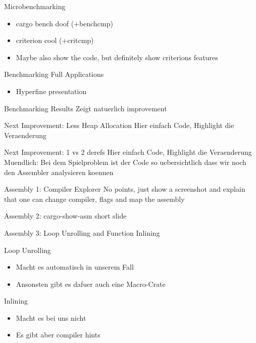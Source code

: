\documentclass[compress,aspectratio=169]{beamer}
\begin{document}
\begin{frame}{Microbenchmarking}
  \begin{itemize}
    \item cargo bench doof (+benchcmp)
    \item criterion cool (+critcmp)
    \item Maybe also show the code, but definitely show criterions features
  \end{itemize}
\end{frame}

\begin{frame}{Benchmarking Full Applications}
  \begin{itemize}
    \item Hyperfine presentation
  \end{itemize}
\end{frame}

\begin{frame}{Benchmarking Results}
  Zeigt natuerlich improvement
\end{frame}

\begin{frame}{Next Improvement: Less Heap Allocation}
  Hier einfach Code, Highlight die Veraenderung
\end{frame}

\begin{frame}{Next Improvement: 1 vs 2 derefs}
  Hier einfach Code, Highlight die Veraenderung\\
  Muendlich: Bei dem Spielproblem ist der Code so uebersichtlich dass wir noch den Assembler analysieren koennen
\end{frame}

\begin{frame}{Assembly 1: Compiler Explorer}
  No points, just show a screenshot and explain that one can change compiler, flags and map the assembly
\end{frame}

\begin{frame}{Assembly 2: cargo-show-asm}
  short slide
\end{frame}

\begin{frame}{Assembly 3: Loop Unrolling and Function Inlining}
  \begin{block}{Loop Unrolling}
    \begin{itemize}
      \item Macht es automatisch in unserem Fall
      \item Ansonsten gibt es dafuer auch eine Macro-Crate
    \end{itemize}
  \end{block}
  \begin{block}{Inlining}
    \begin{itemize}
      \item Macht es bei uns nicht
      \item Es gibt aber compiler hints
    \end{itemize}
  \end{block}
\end{frame}
\end{document}
